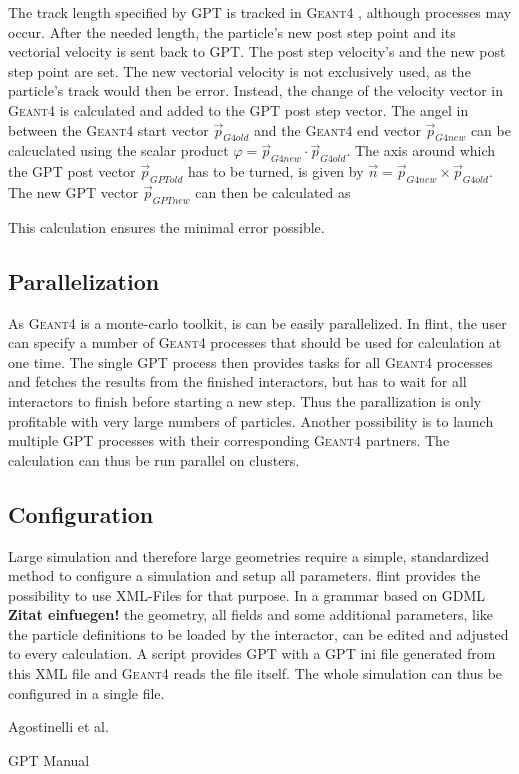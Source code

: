 \documentclass[3p, twocolumn, number, a4paper, 10pt, oneside, preprint]{elsarticle}
\newcommand{\geant}{\textsc{Geant4} }
\begin{document}
The track length specified by GPT is tracked in \geant, although processes may occur. After the needed length, the particle's new post step point and its vectorial velocity is sent back to GPT. The post step velocity's and the new post step point are set. The new vectorial velocity is not exclusively used, as the particle's track would then be error. Instead, the change of the velocity vector in \geant is calculated and added to the GPT post step vector. The angel in between the \geant start vector $\vec{p}_{G4 old}$ and the \geant end vector $\vec{p}_{G4 new}$ can be calcuclated using the scalar product $\varphi = \vec{p}_{G4 new} \cdot \vec{p}_{G4 old}$. The axis around which the GPT post vector $\vec{p}_{GPT old}$ has to be turned, is given by $\vec{n} = \vec{p}_{G4 new} \times \vec{p}_{G4 old}$. The new GPT vector $\vec{p}_{GPT new}$ can then be calculated as


This calculation ensures the minimal error possible.

\subsection{Parallelization}
\label{paralel}

As \geant is a monte-carlo toolkit, is can be easily parallelized. In flint, the user can specify a number of \geant processes that should be used for calculation at one time. The single GPT process then provides tasks for all \geant processes and fetches the results from the finished interactors, but has to wait for all interactors to finish before starting a new step. Thus the parallization is only profitable with very large numbers of particles. Another possibility is to launch multiple GPT processes with their corresponding \geant partners. The calculation can thus be run parallel on clusters.

\subsection{Configuration}

Large simulation and therefore large geometries require a simple, standardized method to configure a simulation and setup all parameters. flint provides the possibility to use XML-Files for that purpose. In a grammar based on GDML \textbf{Zitat einfuegen!} the geometry, all fields and some additional parameters, like the particle definitions to be loaded by the interactor, can be edited and adjusted to every calculation. A script provides GPT with a GPT ini file generated from this XML file and \geant reads the file itself. The whole simulation can thus be configured in a single file.

\begin{thebibliography}{00}

\item{Agostinelli et al.}
\item{GPT Manual}

\end{thebibliography}
\end{document}
